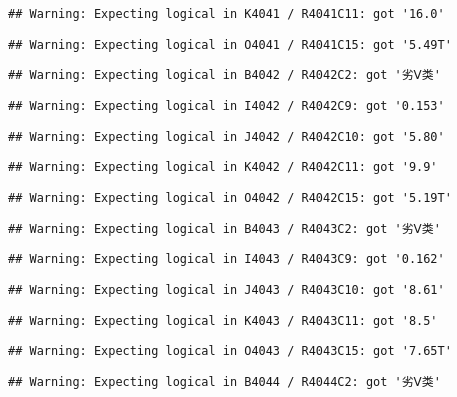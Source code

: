 \documentclass[
]{article}
\begin{document}
\begin{verbatim}
## Warning: Expecting logical in K4041 / R4041C11: got '16.0'
\end{verbatim}

\begin{verbatim}
## Warning: Expecting logical in O4041 / R4041C15: got '5.49T'
\end{verbatim}

\begin{verbatim}
## Warning: Expecting logical in B4042 / R4042C2: got '劣Ⅴ类'
\end{verbatim}

\begin{verbatim}
## Warning: Expecting logical in I4042 / R4042C9: got '0.153'
\end{verbatim}

\begin{verbatim}
## Warning: Expecting logical in J4042 / R4042C10: got '5.80'
\end{verbatim}

\begin{verbatim}
## Warning: Expecting logical in K4042 / R4042C11: got '9.9'
\end{verbatim}

\begin{verbatim}
## Warning: Expecting logical in O4042 / R4042C15: got '5.19T'
\end{verbatim}

\begin{verbatim}
## Warning: Expecting logical in B4043 / R4043C2: got '劣Ⅴ类'
\end{verbatim}

\begin{verbatim}
## Warning: Expecting logical in I4043 / R4043C9: got '0.162'
\end{verbatim}

\begin{verbatim}
## Warning: Expecting logical in J4043 / R4043C10: got '8.61'
\end{verbatim}

\begin{verbatim}
## Warning: Expecting logical in K4043 / R4043C11: got '8.5'
\end{verbatim}

\begin{verbatim}
## Warning: Expecting logical in O4043 / R4043C15: got '7.65T'
\end{verbatim}

\begin{verbatim}
## Warning: Expecting logical in B4044 / R4044C2: got '劣Ⅴ类'
\end{verbatim}
\end{document}
